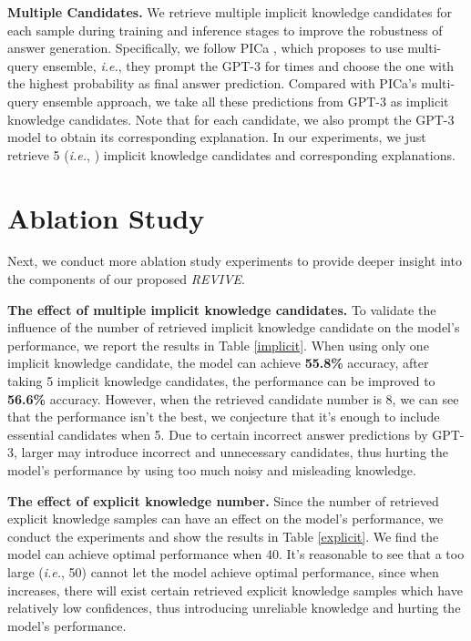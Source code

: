 \documentclass{article}
\begin{document}
\textbf{Multiple Candidates. } We retrieve multiple implicit knowledge candidates for each sample during training and inference stages to improve the robustness of answer generation. Specifically, we follow PICa \cite{yang2021empirical}, which proposes to use multi-query ensemble, \textit{i.e.}, they prompt the GPT-3 \cite{brown2020language} for  times and choose the one with the highest probability as final answer prediction. Compared with PICa's multi-query ensemble approach, we take all these  predictions from GPT-3 \cite{brown2020language} as implicit knowledge candidates. Note that for each candidate, we also prompt the GPT-3 model to obtain its corresponding explanation. In our experiments, we just retrieve 5 (\textit{i.e.}, ) implicit knowledge candidates and corresponding explanations.

\section{Ablation Study}
\label{sup_ablation}

Next, we conduct more ablation study experiments to provide deeper insight into the components of our proposed \textit{REVIVE}.

\textbf{The effect of multiple implicit knowledge candidates. } To validate the influence of the number of retrieved implicit knowledge candidate on the model's performance, we report the results in Table \ref{implicit}. When using only one implicit knowledge candidate, the model can achieve \textbf{55.8\%} accuracy, after taking 5 implicit knowledge candidates, the performance can be improved to \textbf{56.6\%} accuracy. However, when the retrieved candidate number is 8, we can see that the performance isn't the best, we conjecture that it's enough to include essential candidates when  5. Due to certain incorrect answer predictions by GPT-3, larger  may introduce incorrect and unnecessary candidates, thus hurting the model's performance by using too much noisy and misleading knowledge.

\textbf{The effect of explicit knowledge number. } Since the number of retrieved explicit knowledge samples can have an effect on the model's performance, we conduct the experiments and show the results in Table \ref{explicit}. We find the model can achieve optimal performance when  40. It's reasonable to see that a too large  (\textit{i.e.},  50) cannot let the model achieve optimal performance, since when  increases, there will exist certain retrieved explicit knowledge samples which have relatively low confidences, thus introducing unreliable knowledge and hurting the model's performance.
\end{document}
